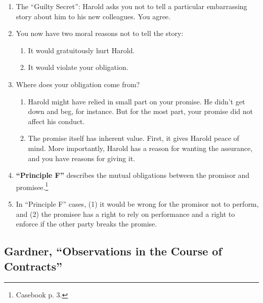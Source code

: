 \begin{enumerate}
    \item The ``Guilty Secret'': Harold asks you not to tell a particular 
    embarrassing story about him to his new colleagues. You agree.
    \item You now have two moral reasons not to tell the story:
    \begin{enumerate}
        \item It would gratuitously hurt Harold.
        \item It would violate your obligation.
    \end{enumerate}
    \item Where does your obligation come from?
    \begin{enumerate}
        \item Harold might have relied in small part on your promise. He 
        didn't get down and beg, for instance. But for the most part, your 
        promise did not affect his conduct.
        \item The promise itself has inherent value. First, it gives Harold 
        peace of mind. More importantly, Harold has a reason for wanting the 
        assurance, and you have reasons for giving it.
    \end{enumerate}
    \item \textbf{``Principle F''} describes the mutual obligations between 
    the promisor and promisee.\footnote{Casebook p. 3.}
    \item In ``Principle F'' cases, (1) it would be wrong for the promisor not 
    to perform, and (2) the promisee has a right to rely on performance and a 
    right to enforce if the other party breaks the promise.
\end{enumerate}

\subsection{Gardner, ``Observations in the Course of Contracts''}


